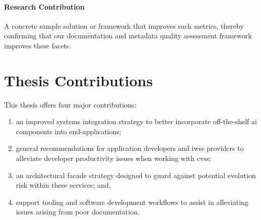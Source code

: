 \begin{titled-frame}
\paragraph{Research Contribution}
A concrete sample solution or framework that improves such metrics, thereby confirming that our documentation and metadata quality assessment framework improves these facets.
\ifdefined\review\else\end{titled-frame}\fi
\color{black}

\section{Thesis Contributions}

This thesis offers four major contributions:

\begin{enumerate}[label=(\roman*),leftmargin=2\parindent]
  \item an improved systems integration strategy to better incorporate off-the-shelf \gls{ai} components into end-applications;
  \item general recommendations for application developers and \glspl{iws} providers to alleviate developer productivity issues when working with \glspl{cvs};
  \item an architectural facade strategy designed to guard against potential evolution risk within these services; and,
  \item support tooling and software development workflows to assist in alleviating issues arising from poor documentation.
\end{enumerate}

%
%

